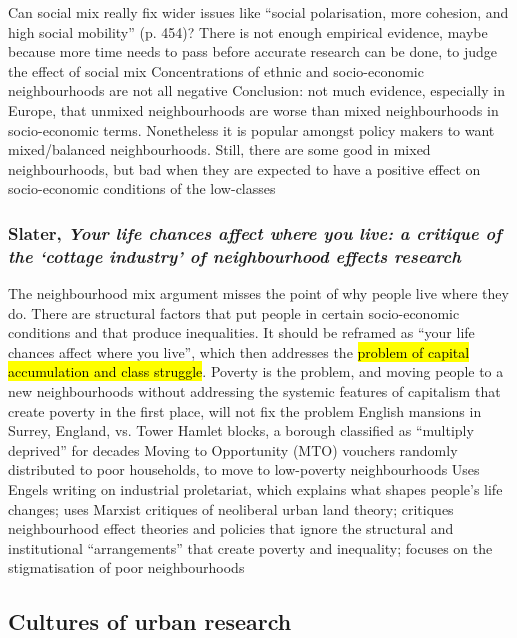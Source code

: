 \documentclass{article}
\begin{document}
\begin{outline}
		\2 Can social mix really fix wider issues like ``social polarisation, more cohesion, and high social mobility'' (p. 454)?
		\2 There is not enough empirical evidence, maybe because more time needs to pass before accurate research can be done, to judge the effect of social mix 
	\1 Concentrations of ethnic and socio-economic neighbourhoods are not all negative
	\1 Conclusion: not much evidence, especially in Europe, that unmixed neighbourhoods are worse than mixed neighbourhoods in socio-economic terms. Nonetheless it is popular amongst policy makers to want mixed/balanced neighbourhoods. Still, there are some good in mixed neighbourhoods, but bad when they are expected to have a positive effect on socio-economic conditions of the low-classes
\end{outline}

\subsubsection{Slater, \textit{Your life chances affect where you live: a critique of the `cottage industry' of neighbourhood effects research}}

\begin{outline}
	\1 The neighbourhood mix argument misses the point of why people live where they do. There are structural factors that put people in certain socio-economic conditions and that produce inequalities. It should be reframed as ``your life chances affect where you live'', which then addresses the \hl{problem of capital accumulation and class struggle}. Poverty is the problem, and moving people to a new neighbourhoods without addressing the systemic features of capitalism that create poverty in the first place, will not fix the problem
	\1 English mansions in Surrey, England, vs. Tower Hamlet blocks, a borough classified as ``multiply deprived'' for decades
	\1 Moving to Opportunity (MTO) vouchers randomly distributed to poor households, to move to low-poverty neighbourhoods
	\1 Uses Engels writing on industrial proletariat, which explains what shapes people's life changes; uses Marxist critiques of neoliberal urban land theory; critiques neighbourhood effect theories and policies that ignore the structural and institutional ``arrangements'' that create poverty and inequality; focuses on the stigmatisation of poor neighbourhoods
\end{outline}

\subsection{Cultures of urban research}
\end{document}
